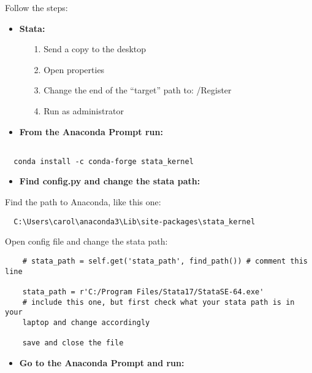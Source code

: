 \documentclass[12pt]{article}
\begin{document}
Follow the steps:
\begin{itemize}
  \item \textbf{Stata:}
    \begin{itemize}
      \item[1.] Send a copy to the desktop
      \item[2.] Open properties 
      \item[3.] Change the end of the “target” path to:  /Register
      \item[4.] Run as administrator
    \end{itemize}
\end{itemize}

\begin{itemize}
  \item \textbf{From the Anaconda Prompt run:} 
\end{itemize}

\begin{verbatim}

  conda install -c conda-forge stata_kernel

\end{verbatim}
  

\begin{itemize}
  \item \textbf{Find config.py and change the stata path:}
\end{itemize}

Find the path to Anaconda, like this one:

\begin{verbatim}
  C:\Users\carol\anaconda3\Lib\site-packages\stata_kernel
\end{verbatim}

  Open config file and change the stata path:

  \begin{verbatim}
    # stata_path = self.get('stata_path', find_path()) # comment this line 

    stata_path = r'C:/Program Files/Stata17/StataSE-64.exe' 
    # include this one, but first check what your stata path is in your 
    laptop and change accordingly

    save and close the file
  \end{verbatim}
  
  

\begin{itemize}
  \item \textbf{Go to the Anaconda Prompt and run:} 
\end{itemize}
\end{document}
